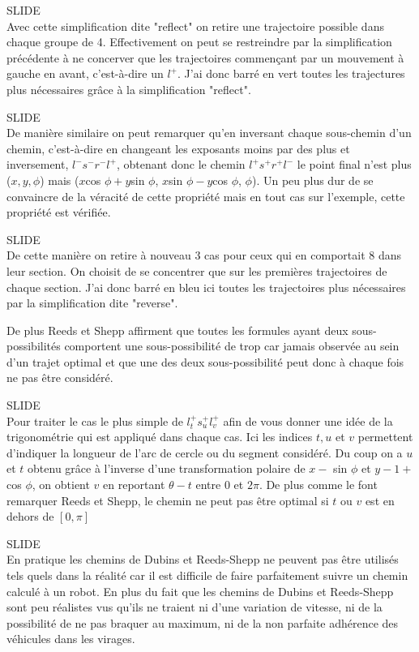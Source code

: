 \documentclass[12pt,a4paper]{article}
\newcommand{\slide}{\vspace{0.6cm}SLIDE\\}
\begin{document}
	\slide
	
	Avec cette simplification dite "reflect" on retire une trajectoire possible dans chaque groupe de 4. Effectivement on peut se restreindre par la simplification précédente à ne concerver que les trajectoires commençant par un mouvement à gauche en avant, c'est-à-dire un $l^+$. J'ai donc barré en vert toutes les trajectures plus nécessaires grâce à la simplification "reflect".
	
	\slide
	
	De manière similaire on peut remarquer qu'en inversant chaque sous-chemin d'un chemin, c'est-à-dire en changeant les exposants moins par des plus et inversement, $l^-s^-r^-l^+$, obtenant donc le chemin $l^+s^+r^+l^-$ le point final n'est plus ($x, y, \phi$) mais ($x$cos $\phi+y$sin $\phi$, $x$sin $\phi-y$cos $\phi$, $\phi$). Un peu plus dur de se convaincre de la véracité de cette propriété mais en tout cas sur l'exemple, cette propriété est vérifiée.
	
	\slide
	
	De cette manière on retire à nouveau 3 cas pour ceux qui en comportait 8 dans leur section. On choisit de se concentrer que sur les premières trajectoires de chaque section. J'ai donc barré en bleu ici toutes les trajectoires plus nécessaires par la simplification dite "reverse".
	
	
	De plus Reeds et Shepp affirment que toutes les formules ayant deux sous-possibilités comportent une sous-possibilité de trop car jamais observée au sein d'un trajet optimal et que une des deux sous-possibilité peut donc à chaque fois ne pas être considéré.
	
	\slide
	
	Pour traiter le cas le plus simple de $l_t^+s_u^+l_v^+$ afin de vous donner une idée de la trigonométrie qui est appliqué dans chaque cas. Ici les indices $t, u$ et $v$ permettent d'indiquer la longueur de l'arc de cercle ou du segment considéré. Du coup on a $u$ et $t$ obtenu grâce à l'inverse d'une transformation polaire de $x -$ sin $\phi$ et $y - 1 +$ cos $\phi$, on obtient $v$ en reportant $\theta - t$ entre 0 et $2\pi$. De plus comme le font remarquer Reeds et Shepp, le chemin ne peut pas être optimal si $t$ ou $v$ est en dehors de $[0, \pi]$
	
	\slide
	
	En pratique les chemins de Dubins et Reeds-Shepp ne peuvent pas être utilisés tels quels dans la réalité car il est difficile de faire parfaitement suivre un chemin calculé à un robot. En plus du fait que les chemins de Dubins et Reeds-Shepp sont peu réalistes vus qu'ils ne traient ni d'une variation de vitesse, ni de la possibilité de ne pas braquer au maximum, ni de la non parfaite adhérence des véhicules dans les virages.
	
\end{document}
